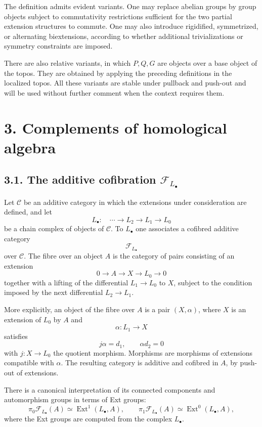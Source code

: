 \documentclass[11pt]{article}
\newcommand{\Ext}{\operatorname{Ext}}
\newcommand{\cF}{\mathcal F}
\newcommand{\cC}{\mathcal C}
\begin{document}
The definition admits evident variants. One may replace abelian groups by group
objects subject to commutativity restrictions sufficient for the two partial
extension structures to commute. One may also introduce rigidified, symmetrized,
or alternating biextensions, according to whether additional trivializations or
symmetry constraints are imposed.

There are also relative variants, in which \(P,Q,G\) are objects over a base
object of the topos. They are obtained by applying the preceding definitions in
the localized topos. All these variants are stable under pullback and push-out
and will be used without further comment when the context requires them.

\section*{3. Complements of homological algebra}

\subsection*{3.1. The additive cofibration \(\cF_{L_\bullet}\)}

Let \(\cC\) be an additive category in which the extensions under consideration
are defined, and let
\[
L_\bullet:\quad \cdots\longrightarrow L_2\longrightarrow L_1
        \longrightarrow L_0
\]
be a chain complex of objects of \(\cC\). To \(L_\bullet\) one associates a
cofibred additive category
\[
\cF_{L_\bullet}
\]
over \(\cC\). The fibre over an object \(A\) is the category of pairs consisting
of an extension
\[
0\longrightarrow A\longrightarrow X\longrightarrow L_0\longrightarrow 0
\]
together with a lifting of the differential \(L_1\to L_0\) to \(X\), subject to
the condition imposed by the next differential \(L_2\to L_1\).

More explicitly, an object of the fibre over \(A\) is a pair \((X,\alpha)\),
where \(X\) is an extension of \(L_0\) by \(A\) and
\[
\alpha:L_1\longrightarrow X
\]
satisfies
\[
j\alpha=d_1,\qquad \alpha d_2=0
\]
with \(j:X\to L_0\) the quotient morphism. Morphisms are morphisms of extensions
compatible with \(\alpha\). The resulting category is additive and cofibred in
\(A\), by push-out of extensions.

There is a canonical interpretation of its connected components and automorphism
groups in terms of Ext groups:
\[
\pi_0\cF_{L_\bullet}(A)\simeq \Ext^1(L_\bullet,A),\qquad
\pi_1\cF_{L_\bullet}(A)\simeq \Ext^0(L_\bullet,A),
\]
where the Ext groups are computed from the complex \(L_\bullet\).
\end{document}
